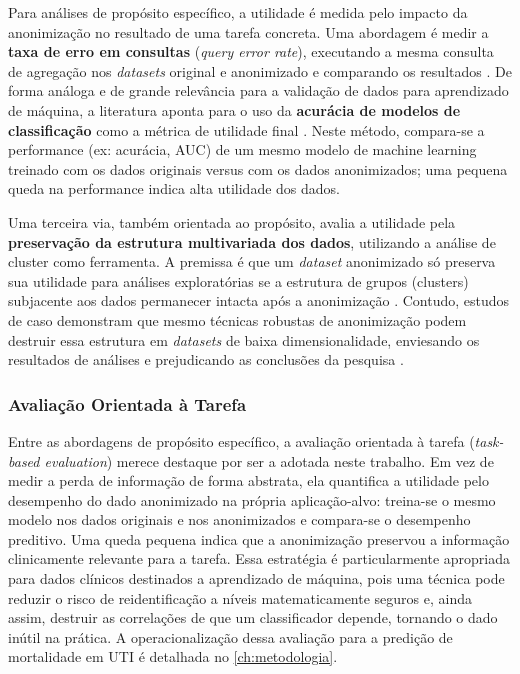 Para análises de propósito específico, a utilidade é medida pelo impacto da anonimização no resultado de uma tarefa concreta. Uma abordagem é medir a \textbf{taxa de erro em consultas} (\textit{query error rate}), executando a mesma consulta de agregação nos \textit{datasets} original e anonimizado e comparando os resultados \cite{Lee2017}. De forma análoga e de grande relevância para a validação de dados para aprendizado de máquina, a literatura aponta para o uso da \textbf{acurácia de modelos de classificação} como a métrica de utilidade final \cite{Olatunji2024}. Neste método, compara-se a performance (ex: acurácia, AUC) de um mesmo modelo de machine learning treinado com os dados originais versus com os dados anonimizados; uma pequena queda na performance indica alta utilidade dos dados.

Uma terceira via, também orientada ao propósito, avalia a utilidade pela \textbf{preservação da estrutura multivariada dos dados}, utilizando a análise de cluster como ferramenta. A premissa é que um \textit{dataset} anonimizado só preserva sua utilidade para análises exploratórias se a estrutura de grupos (clusters) subjacente aos dados permanecer intacta após a anonimização \cite{Ferrao2022}. Contudo, estudos de caso demonstram que mesmo técnicas robustas de anonimização podem destruir essa estrutura em \textit{datasets} de baixa dimensionalidade, enviesando os resultados de análises e prejudicando as conclusões da pesquisa \cite{Ferrao2022}.

\subsubsection{Avaliação Orientada à Tarefa}

Entre as abordagens de propósito específico, a avaliação orientada à tarefa (\textit{task-based evaluation}) merece destaque por ser a adotada neste trabalho. Em vez de medir a perda de informação de forma abstrata, ela quantifica a utilidade pelo desempenho do dado anonimizado na própria aplicação-alvo: treina-se o mesmo modelo nos dados originais e nos anonimizados e compara-se o desempenho preditivo. Uma queda pequena indica que a anonimização preservou a informação clinicamente relevante para a tarefa. Essa estratégia é particularmente apropriada para dados clínicos destinados a aprendizado de máquina, pois uma técnica pode reduzir o risco de reidentificação a níveis matematicamente seguros e, ainda assim, destruir as correlações de que um classificador depende, tornando o dado inútil na prática. A operacionalização dessa avaliação para a predição de mortalidade em UTI é detalhada no \autoref{ch:metodologia}.

